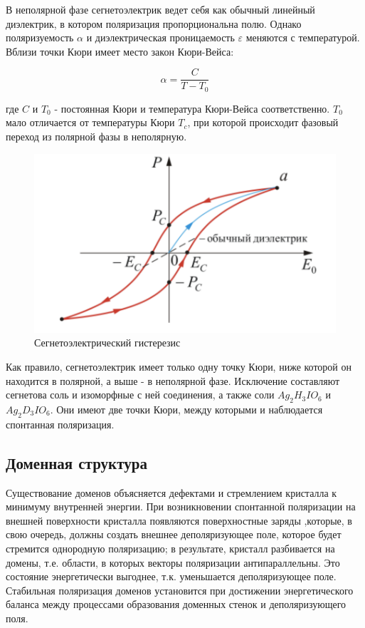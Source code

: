 \documentclass[a4paper]{article}
\begin{document}
\begin{itemize}
В неполярной фазе сегнетоэлектрик ведет себя как обычный линейный диэлектрик, в котором поляризация пропорциональна полю. Однако поляризуемость $\alpha$ и диэлектрическая проницаемость $\varepsilon$ меняются с температурой. Вблизи точки Кюри имеет место закон Кюри-Вейса:

$$\alpha = \frac{C}{T - T_0}$$

где $C$ и $T_0$ - постоянная Кюри и температура Кюри-Вейса соответственно. $T_0$ мало отличается от температуры Кюри $T_c$, при которой происходит фазовый переход из полярной фазы в неполярную. 

\end{itemize}

\begin{figure}
\includegraphics[scale = 0.4]{p1.png}
\caption{Сегнетоэлектрический гистерезис}
\label{p1}
\end{figure}

Как правило, сегнетоэлектрик имеет только одну точку Кюри, ниже которой он находится в полярной, а выше - в неполярной фазе. Исключение составляют сегнетова соль и изоморфные с ней соединения, а также соли $Ag_2H_3IO_6$ и $Ag_2D_3IO_6$. Они имеют две точки Кюри, между которыми и наблюдается спонтанная поляризация. 


\subsection{Доменная структура}

Существование доменов объясняется дефектами и стремлением кристалла к минимуму внутренней энергии. При возникновении спонтанной поляризации на внешней поверхности кристалла появляются поверхностные заряды ,которые, в свою очередь, должны создать внешнее деполяризующее поле, которое будет стремится однородную поляризацию; в результате, кристалл разбивается на домены, т.е. области, в которых векторы поляризации антипараллельны. Это состояние энергетически выгоднее, т.к. уменьшается деполяризующее поле. Стабильная поляризация доменов установится при достижении энергетического баланса между процессами образования доменных стенок и деполяризующего поля. 
\end{document}

